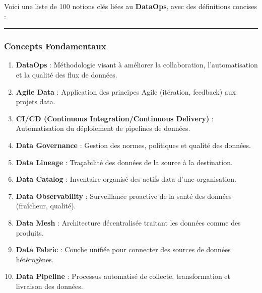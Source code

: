 \documentclass[
  letterpaper,
  DIV=11,
  numbers=noendperiod]{scrartcl}
\author{}
\date{}
\providecommand{\tightlist}{%
  \setlength{\itemsep}{0pt}\setlength{\parskip}{0pt}}\usepackage{longtable,booktabs,array}
\begin{document}
Voici une liste de 100 notions clés liées au \textbf{DataOps}, avec des
définitions concises :

\begin{center}\rule{0.5\linewidth}{0.5pt}\end{center}

\subsubsection{\texorpdfstring{\textbf{Concepts
Fondamentaux}}{Concepts Fondamentaux}}\label{concepts-fondamentaux}

\begin{enumerate}
\def\labelenumi{\arabic{enumi}.}
\tightlist
\item
  \textbf{DataOps} : Méthodologie visant à améliorer la collaboration,
  l'automatisation et la qualité des flux de données.\\
\item
  \textbf{Agile Data} : Application des principes Agile (itération,
  feedback) aux projets data.\\
\item
  \textbf{CI/CD (Continuous Integration/Continuous Delivery)} :
  Automatisation du déploiement de pipelines de données.\\
\item
  \textbf{Data Governance} : Gestion des normes, politiques et qualité
  des données.\\
\item
  \textbf{Data Lineage} : Traçabilité des données de la source à la
  destination.\\
\item
  \textbf{Data Catalog} : Inventaire organisé des actifs data d'une
  organisation.\\
\item
  \textbf{Data Observability} : Surveillance proactive de la santé des
  données (fraîcheur, qualité).\\
\item
  \textbf{Data Mesh} : Architecture décentralisée traitant les données
  comme des produits.\\
\item
  \textbf{Data Fabric} : Couche unifiée pour connecter des sources de
  données hétérogènes.\\
\item
  \textbf{Data Pipeline} : Processus automatisé de collecte,
  transformation et livraison des données.
\end{enumerate}
\end{document}
